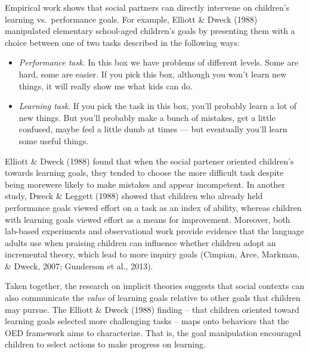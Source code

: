 \documentclass[oneside]{report}
\begin{document}
Empirical work shows that social partners can directly intervene on
children's learning vs.~performance goals. For example, Elliott \& Dweck
(1988) manipulated elementary school-aged children's goals by presenting
them with a choice between one of two tasks described in the following
ways:
\begin{itemize}
\tightlist
\item
  \emph{Performance task}. In this box we have problems of different
  levels. Some are hard, some are easier. If you pick this box, although
  you won't learn new things, it will really show me what kids can do.
\item
  \emph{Learning task}. If you pick the task in this box, you'll
  probably learn a lot of new things. But you'll probably make a bunch
  of mistakes, get a little confused, maybe feel a little dumb at times
  --- but eventually you'll learn some useful things.
\end{itemize}
\noindent Elliott \& Dweck (1988) found that when the social partener
oriented children's towards learning goals, they tended to choose the
more difficult task despite being morewere likely to make mistakes and
appear incompetent. In another study, Dweck \& Leggett (1988) showed
that children who already held performance goals viewed effort on a task
as an index of ability, whereas children with learning goals viewed
effort as a means for improvement. Moreover, both lab-based experiments
and observational work provide evidence that the language adults use
when praising children can influence whether children adopt an
incremental theory, which lead to more inquiry goals (Cimpian, Arce,
Markman, \& Dweck, 2007; Gunderson et al., 2013).

Taken together, the research on implicit theories suggests that social
contexts can also communicate the \emph{value} of learning goals
relative to other goals that children may pursue. The Elliott \& Dweck
(1988) finding -- that children oriented toward learning goals selected
more challenging tasks -- maps onto behaviors that the OED framework
aims to characterize. That is, the goal manipulation encouraged children
to select actions to make progress on learning.
\end{document}

